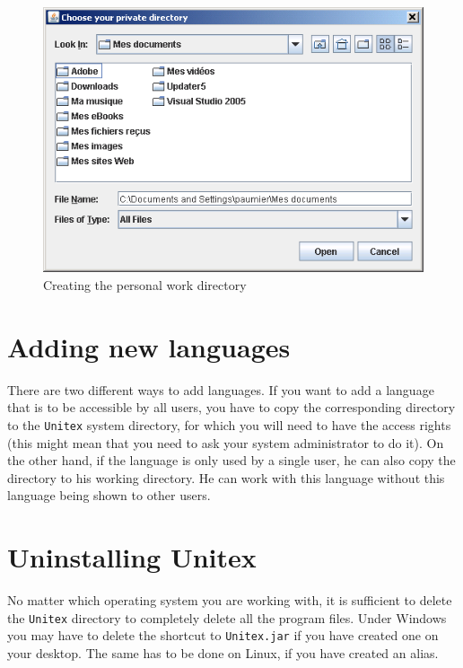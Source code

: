 \begin{figure}[h]
\begin{center}
\includegraphics[width=13cm]{resources/img/fig1-3.png}
\caption{Creating the personal work
directory\label{fig-creation-personal-directory}}
\end{center}
\end{figure}



\section{Adding new languages}

\bigskip
\noindent There are two different ways to add languages. If you want to add 
a language that is to be accessible by all  users, you have to copy the 
corresponding directory to the \verb+Unitex+ system directory, for which 
you will need to have the access rights  (this might mean that you need to 
ask your system administrator to do it). On the other hand, if the language 
is only used by a single user, he can also copy the directory to his working 
directory. He can work with this language without this language being shown to other users.


\section{Uninstalling Unitex}
No matter which operating system you are working with, it is sufficient to delete 
the \verb+Unitex+ directory to completely delete all the program files. Under
Windows you may have to delete the shortcut to \verb+Unitex.jar+  
if you have created one on your desktop. The same has to be done on Linux, if you have 
created an alias.


